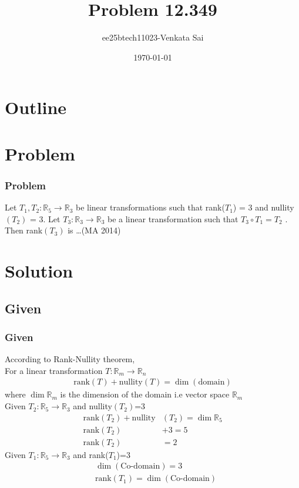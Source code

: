 \documentclass{beamer}
\title{Problem 12.349}
\author{ee25btech11023-Venkata Sai}
\date{\today}
\providecommand{\brak}[1]{\ensuremath{\left(#1\right)}}
\theoremstyle{remark}
\numberwithin{equation}{section}
\begin{document}
\begin{frame}
\titlepage
\end{frame}

\section*{Outline}
\begin{frame}
\tableofcontents
\end{frame}

\section{Problem}

\begin{frame}
\frametitle{Problem}
Let $T_1 , T_2 : \mathbb{R}_5 \rightarrow \mathbb{R}_3 $ be linear transformations such that rank($T_1$) = 3 and
nullity$\brak{T_2}$ = 3. Let $T_3 : \mathbb{R}_3 \rightarrow \mathbb{R}_3$ be a linear transformation such that $T_3 \circ T_1 = T_2$ .
Then rank$\brak{T_3}$ is \dots \hfill (MA 2014)
\end{frame}
\section{Solution}

 
\subsection{Given}
\begin{frame}
\frametitle{Given}
According to Rank-Nullity theorem,\\
For a linear transformation $T : \mathbb{R}_m \rightarrow \mathbb{R}_n $
\begin{align}
    \text{rank}\brak{T}+\text{nullity}\brak{T}=\dim\brak{\text{domain}}
\end{align}
where $\dim\mathbb{R}_m $ is the dimension of the domain i.e vector space $\mathbb{R}_m $ \\ \newline
Given $T_2 : \mathbb{R}_5 \rightarrow \mathbb{R}_3 $ and nullity$\brak{T_2}$=3 
\begin{align}
    \text{rank}\brak{T_2}+\text{nullity}&\brak{T_2}=\dim\mathbb{R}_5 \\
    \text{rank}\brak{T_2}&+3=5 \\
    \text{rank}\brak{T_2} &= 2
\end{align}
Given $T_1 : \mathbb{R}_5 \rightarrow \mathbb{R}_3 $ and rank($T_1$)=3
\begin{align}
    &\dim\brak{\text{Co-domain}} =3 \\
    &\text{rank}\brak{T_1}=\dim\brak{\text{Co-domain}} 
\end{align}
\end{frame}
\end{document}

